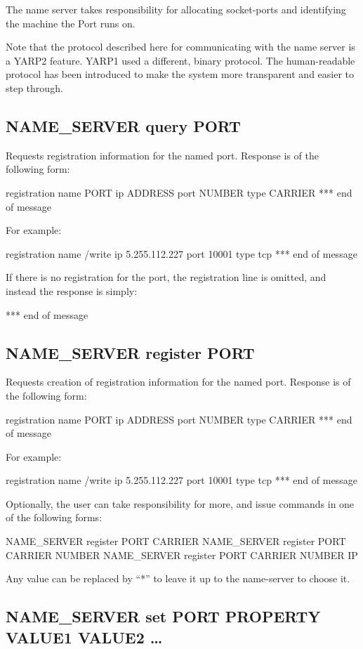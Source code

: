 \documentclass[a4]{article}
\newenvironment{codecase}[1]{\subsection{#1}}{}
\begin{document}
The name server takes responsibility for allocating
socket-ports and identifying the machine the Port runs on.

Note that the protocol described here for communicating with the name
server is a YARP2 feature.  YARP1 used a different, binary protocol.
The human-readable protocol has been introduced to make the system
more transparent and easier to step through.

\begin{codecase}{NAME\_SERVER query PORT}
Requests registration information for the named port.  Response is of 
the following form:
\begin{code}
registration name PORT ip ADDRESS port NUMBER type CARRIER
*** end of message
\end{code}
For example:
\begin{code}
registration name /write ip 5.255.112.227 port 10001 type tcp
*** end of message
\end{code}
If there is no registration for the port, the registration line
is omitted, and instead the response is simply:
\begin{code}
*** end of message
\end{code}
\end{codecase}


\begin{codecase}{NAME\_SERVER register PORT}

Requests creation of registration information for the named port.  
Response is of the following form:
\begin{code}
registration name PORT ip ADDRESS port NUMBER type CARRIER
*** end of message
\end{code}
For example:
\begin{code}
registration name /write ip 5.255.112.227 port 10001 type tcp
*** end of message
\end{code}
%
Optionally, the user can take responsibility for more, and 
issue commands in one of the following forms:
\begin{code}
NAME_SERVER register PORT CARRIER
NAME_SERVER register PORT CARRIER NUMBER
NAME_SERVER register PORT CARRIER NUMBER IP
\end{code}
Any value can be replaced by ``*'' to leave it up to the
name-server to choose it.
\end{codecase}

\begin{codecase}{NAME\_SERVER set PORT PROPERTY VALUE1 VALUE2 \ldots}

\end{codecase}
\end{document}
